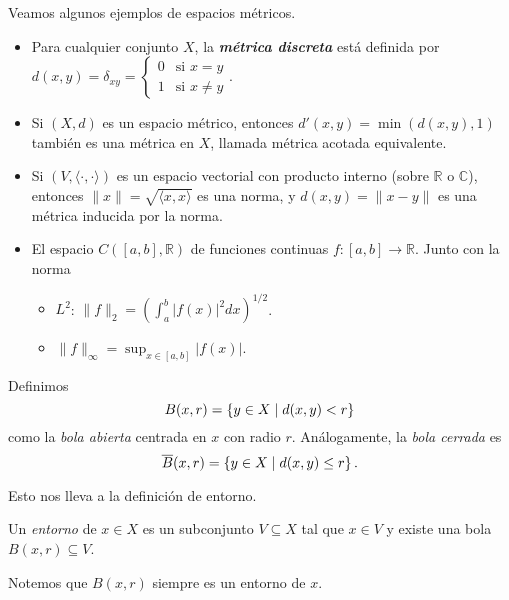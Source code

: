 \documentclass[11pt]{article}
\begin{document}
Veamos algunos ejemplos de espacios métricos.

\begin{example}
\begin{itemize}
    \item Para cualquier conjunto $X$, la \textbf{\textit{métrica discreta}} está definida por $d(x, y) = \delta_{xy} = \begin{cases} 0 & \text{si } x = y \\ 1 & \text{si } x \neq y \end{cases}$.

    \item Si $(X, d)$ es un espacio métrico, entonces $d'(x, y) = \min(d(x, y), 1)$ también es una métrica en $X$, llamada métrica acotada equivalente.

    \item Si $(V, \langle \cdot, \cdot \rangle)$ es un espacio vectorial con producto interno (sobre $\mathbb{R}$ o $\mathbb{C}$), entonces $\|x\| = \sqrt{\langle x, x \rangle}$ es una norma, y $d(x, y) = \|x - y\|$ es una métrica inducida por la norma.

    \item El espacio $C([a, b], \mathbb{R})$ de funciones continuas $f: [a, b] \to \mathbb{R}$. Junto con la norma
    \begin{itemize}
        \item $L^2$: $\|f\|_2 = \left( \int_a^b |f(x)|^2 dx \right)^{1/2}$.
        \item $\|f\|_{\infty} = \sup_{x \in [a,b]} |f(x)|$.
    \end{itemize}
\end{itemize}
\end{example}

\begin{definition}
    Definimos
    $$
        B(x, r) = \left\{  y \in X \mid d(x, y) < r \right\}
    $$ como la \emph{bola abierta} centrada en $x$ con radio $r$. Análogamente, la \emph{bola cerrada} es 
    $$
        \overline{B}(x, r) = \left\{  y \in X \mid d(x, y) \leq  r \right\}.
    $$
\end{definition}

Esto nos lleva a la definición de entorno.

\begin{definition}
    Un \emph{entorno} de $x \in X$ es un subconjunto $V \subseteq X$ tal que $x \in V$ y existe una bola $B(x, r) \subseteq V$.
\end{definition}

\begin{remark}
    Notemos que $B(x, r)$ siempre es un entorno de $x$.
\end{remark}
\end{document}
